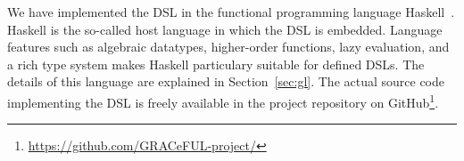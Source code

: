 We have implemented the \acl{DSL} in the functional programming language
Haskell~\cite{haskell98}. Haskell is the so-called host language in which the
\ac{DSL} is embedded. Language features such as algebraic datatypes,
higher-order functions, lazy evaluation, and a rich type system makes Haskell
particulary suitable for defined \acp{DSL}. The details of this language are
explained in Section~\ref{sec:gl}. The actual source code implementing the DSL
is freely available in the project repository on
GitHub\footnote{\url{https://github.com/GRACeFUL-project/}}.







